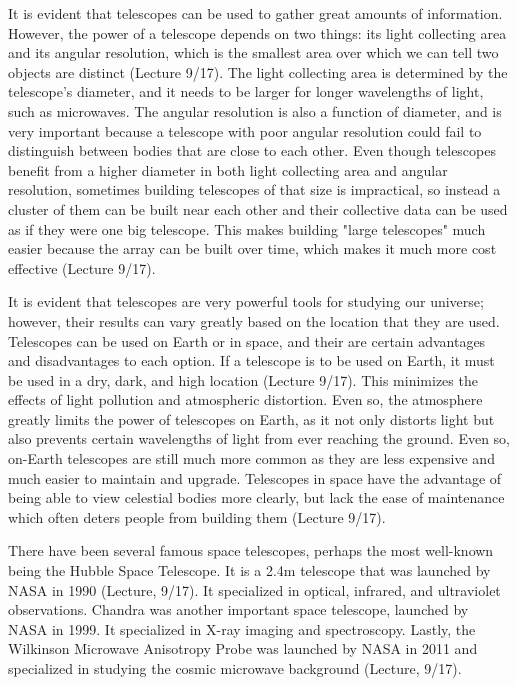 \documentclass[14pt]{article}
\begin{document}
\vspace{5mm}
It is evident that telescopes can be used to gather great amounts of
information.  However, the power of a telescope depends on two things: its light
collecting area and its angular resolution, which is the
smallest area over which we can tell two objects are distinct (Lecture 9/17).
The light collecting area is determined by the telescope's diameter, and it
needs to be larger for longer wavelengths of light, such as microwaves.  The
angular resolution is also a function of diameter, and is very important because
a telescope with poor angular resolution could fail to distinguish between
bodies that are close to each other.  Even though telescopes benefit from a
higher diameter in both light collecting area and angular resolution, sometimes
building telescopes of that size is impractical, so instead a cluster of them
can be built near each other and their collective data can be used as if they
were one big telescope.  This makes building "large telescopes" much easier
because the array can be built over time, which makes it much more cost
effective (Lecture 9/17).

\vspace{5mm}
It is evident that telescopes are very powerful tools for studying our universe;
however, their results can vary greatly based on the location that they are
used.  Telescopes can be used on Earth or in space, and their are certain
advantages and disadvantages to each option.  If a telescope is to be used on
Earth, it must be used in a dry, dark, and high location (Lecture 9/17).  This
minimizes the effects of light pollution and atmospheric distortion.  Even so,
the atmosphere greatly limits the power of telescopes on Earth, as it not only
distorts light but also prevents certain wavelengths of light from ever reaching
the ground.  Even so, on-Earth telescopes are still much more common as they are
less expensive and much easier to maintain and upgrade.  Telescopes in space
have the advantage of being able to view celestial bodies more clearly, but lack
the ease of maintenance which often deters people from building them (Lecture
9/17).

\vspace{5mm}
There have been several famous space telescopes, perhaps the most well-known
being the Hubble Space Telescope.  It is a 2.4m telescope that was launched by
NASA in 1990 (Lecture, 9/17).  It specialized in optical, infrared, and ultraviolet
observations.  Chandra was another important space telescope, launched by NASA
in 1999.  It specialized in X-ray imaging and spectroscopy.  Lastly,  the
Wilkinson Microwave Anisotropy Probe was launched by NASA in 2011 and
specialized in studying the cosmic microwave background (Lecture, 9/17).
\end{document}

